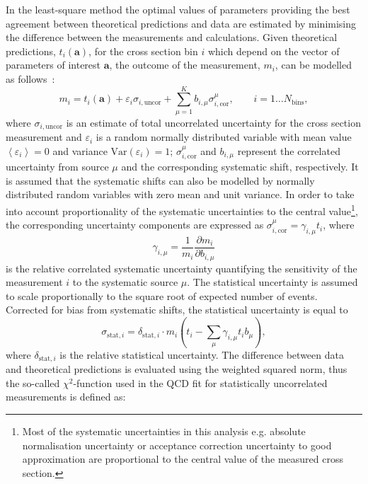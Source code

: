 In the least-square method the optimal values of parameters providing the best agreement between theoretical predictions and data are estimated by minimising the difference between the measurements and calculations. Given theoretical predictions, $t_i\left( \mathbf{a} \right)$, for the cross section bin $i$ which depend on the vector of parameters of interest $\mathbf{a}$, the outcome of the measurement, $m_i$, can be modelled as follows~\cite{Stump:2001gu,Botje:2001fx}:
\begin{equation}
 m_i = t_i\left( \mathbf{a} \right) + \varepsilon_{i} \sigma_{i,\text{uncor}} + \sum_{\mu=1}^{K}{b_{i,\mu}\sigma_{i,\text{cor}}^\mu}, \qquad i=1\ldots N_\text{bins},
\end{equation}
where $\sigma_{i,\text{uncor}}$ is an estimate of total uncorrelated uncertainty for the cross section measurement and $\varepsilon_{i}$ is a random normally distributed variable with mean value $\left\langle \varepsilon_{i}\right\rangle = 0$ and variance $\text{Var}\left( \varepsilon_{i}\right) = 1$; $\sigma_{i,\text{cor}}^\mu$ and $b_{i,\mu}$ represent the correlated uncertainty from source $\mu$ and the corresponding systematic shift, respectively. It is assumed that the systematic shifts can also be modelled by normally distributed random variables with zero mean and unit variance. In order to take into account proportionality of the systematic uncertainties to the central value\footnote{Most of the systematic uncertainties in this analysis e.g. absolute normalisation uncertainty or acceptance correction uncertainty to good approximation are proportional to the central value of the measured cross section.}, the corresponding uncertainty components are expressed as $\sigma_{i,\text{cor}}^\mu = \gamma_{i,\mu}t_i$, where 
\begin{equation}
\gamma_{i,\mu}=\frac{1}{{m_i}} \frac{\partial m_i}{\partial b_{i,\mu}}
\end{equation}
is the relative correlated systematic uncertainty quantifying the sensitivity of the measurement $i$ to the systematic source $\mu$. The statistical uncertainty is assumed to scale proportionally to the square root of expected number of events. Corrected for bias from systematic shifts, the statistical uncertainty is equal to
\begin{equation}
 \sigma_{\text{stat},i} = \delta_{\text{stat},i}\cdot m_i\left( t_i - \sum_\mu\gamma_{i,\mu}t_ib_\mu \right),
\end{equation}
where $\delta_{\text{stat},i}$ is the relative statistical uncertainty. The difference between data and theoretical predictions is evaluated using the weighted squared norm, thus the so-called $\chi^2$-function used in the QCD fit  for statistically uncorrelated measurements is defined as:
